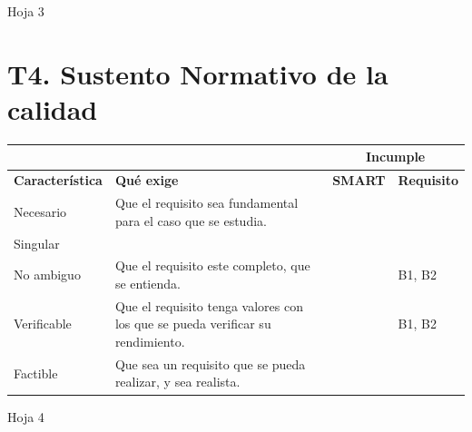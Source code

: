 \documentclass[11pt,a4paper]{article}
\begin{document}
\hfill Hoja 3

\newpage

\section*{T4. Sustento Normativo de la calidad}

\begin{longtable}{|p{2.6cm}|p{6.5cm}|p{2.4cm}|p{3cm}|}
\hline
 & & \multicolumn{2}{c|}{Incumple}\\
\hline
\textbf{Característica} & \textbf{Qué exige} & \textbf{SMART} & \textbf{Requisito}\\
\hline
\endhead
Necesario & Que el requisito sea fundamental para el caso que se estudia. & & \\
\hline
Singular & & & \\
\hline
No ambiguo & Que el requisito este completo, que se entienda. & & B1, B2\\
\hline
Verificable & Que el requisito tenga valores con los que se pueda verificar su rendimiento. & & B1, B2\\
\hline
Factible & Que sea un requisito que se pueda realizar, y sea realista. & & \\
\hline
\end{longtable}

\hfill Hoja 4
\end{document}
